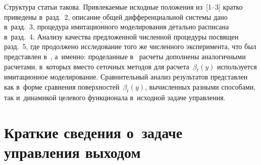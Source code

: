 \begin{multicols}{2}
     Структура статьи такова. Привлекаемые исходные положения из~[1--3] 
кратко приведены в~разд.~2, описание общей дифференциальной системы 
дано в~разд.~3, процедура имитационного моделирования детально 
расписана в~разд.~4. Анализу качества предложенной численной процедуры 
посвящен разд.~5, где продолжено исследование того же численного 
эксперимента, что был пред\-став\-лен в~\cite{2-bos}, а~именно: проделанные 
в~\cite{2-bos} расчеты дополнены аналогичными расчетами, в~которых 
вмес\-то сеточных методов для расчета~$\beta_t(y)$ используется 
имитационное моделирование. Сравнительный анализ результатов 
представлен как в~форме сравнения поверхностей~$\beta_t(y)$, вычисленных 
разными способами, так и~динамикой целевого функционала в~исходной 
задаче управления.

\section{Краткие сведения о~задаче управления выходом}
     

\end{multicols}
